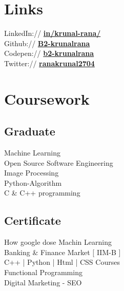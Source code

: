 \documentclass[]{deedy-resume-openfont}
\begin{document}
\begin{minipage}[t]{0.33\textwidth}
\section{Links} 
LinkedIn://  \href{https://www.linkedin.com/in/krunal-rana/}{\bf in/krunal-rana/} \\
Github:// \href{https://github.com/B2-krunalrana}{\bf B2-krunalrana} \\
Codepen://  \href{https://codepen.io/b2-krunalrana}{\bf b2-krunalrana} \\
Twitter://  \href{https://twitter.com/ranakrunal2704}{\bf ranakrunal2704} \\

\sectionsep

\section{Coursework}
\subsection{Graduate}
Machine Learning \\
Open Source Software Engineering \\
Image Processing  \\
Python-Algorithm \\
C \& C++ programming  \\
\sectionsep

\subsection{Certificate}
How google dose Machin Learning \\
Banking & Finance Market [ IIM-B ] \\
C++ | Python | Html | CSS Courses \\
Functional Programming \\
Digital Marketing - SEO \\


\end{minipage}
\end{document}
